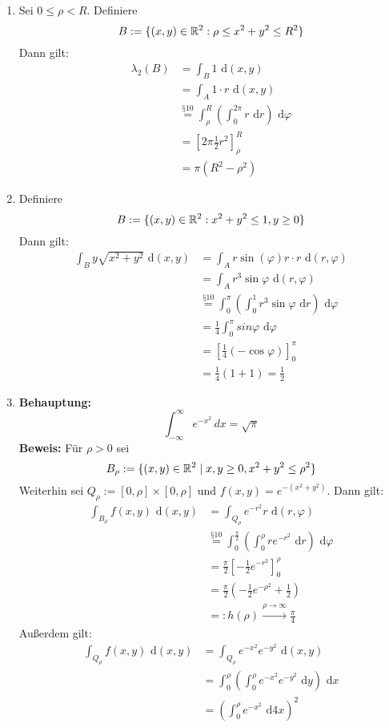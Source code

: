 \documentclass[a4paper,twoside,DIV15,BCOR12mm,chapterprefix=true,headings=onelinechapter]{scrbook}
\begin{document}
\begin{beispiel}
\begin{enumerate}
\item	Sei $0 \le \rho < R$. Definiere 
\[B := \{(x,y) \in \mathbb{R}^2 : \rho \le x^2 + y^2 \le R^2\} \]
Dann gilt: 
\begin{align*}
\lambda_2(B) &= \int_B 1 \text{ d}(x,y)\\ 
&= \int_A 1 \cdot r \text{ d}(x,y)\\ 
&\overset{\text{§10}}= \int_{\rho}^{R} \left( \int_0^{2\pi} r \text{ d}r \right) \text{ d}\varphi\\
&= \left[ 2\pi \frac{1}{2} r^2 \right]_\rho^R\\
&= \pi (R^2 - \rho^2)
\end{align*}
		
\item	Definiere 
\[B := \{ (x,y) \in \mathbb{R}^2 : x^2 + y^2 \le 1, y \ge 0 \}\]
Dann gilt:
\begin{align*}
\int_B y \sqrt{x^2+y^2} \text{ d}(x,y) &= \int_A r \sin(\varphi) r \cdot r \text{ d}(r,\varphi)\\
&= \int_A r^3 \sin\varphi \text{ d}(r,\varphi)	\\
&\overset{\text{§10}}= \int_0^\pi \left( \int_0^1 r^3 \sin\varphi \text{ d}r \right) \text{ d}\varphi\\
&= \frac{1}{4} \int_0^\pi sin\varphi \text{ d}\varphi\\
&= \left[ \frac{1}{4}(-\cos\varphi) \right]_0^\pi\\
&= \frac{1}{4}(1+1) = \frac{1}{2}
\end{align*}
\item	\textbf{Behauptung:} \[\int_{-\infty}^\infty e^{-x^2} \, dx = \sqrt{\pi}\]
\textbf{Beweis:}
Für $\rho > 0$ sei
\[B_\rho := \{(x,y) \in \mathbb{R}^2 \mid x,y\ge 0, x^2+ y^2 \le \rho^2\}\]
Weiterhin sei $Q_\rho := [0,\rho] \times [0,\rho]$ und $f(x,y) = e^{-(x^2 + y^2)}$. Dann gilt:
\begin{align*}
\int_{ B_\rho } f(x,y) \text{ d}(x,y) &= \int_{Q_\rho} e^{-r^2} r\text{ d}(r,\varphi)\\
&\overset{\text{§10}}= \int_0^{\frac{\pi}{2}} \left( \int_0^\rho r e^{-r^2} \text{ d}r \right) \text{ d}\varphi	\\
&= \frac{\pi}{2} \left[ -\frac{1}{2} e^{-r^2} \right]_{0}^{\rho}\\
&= \frac{\pi}{2} \left( -\frac{1}{2} e^{-\rho^2} +\frac{1}{2} \right)	\\
& =: h(\rho) \stackrel{\rho \to \infty}\to \frac\pi4
\end{align*}
Außerdem gilt:
\begin{align*}
\int_{Q_\rho} f(x,y) \text{ d}(x,y) &= \int_{Q_\rho} e^{-x^2} e^{-y^2}\text{ d}(x,y)	\\
&= \int_0^\rho \left( \int_0^\rho e^{-x^2} e^{-y^2} \text{ d}y \right) \text{ d}x \\
&= \left( \int_0^\rho e^{-x^2} \text{ d}4x \right)^2
\end{align*}
		

\end{enumerate}
\end{beispiel}
\end{document}

